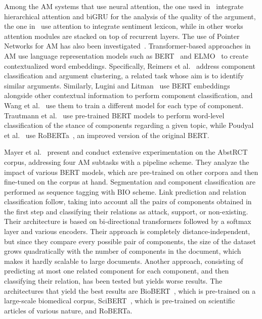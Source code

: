 \documentclass[journal]{IEEEtran}
\begin{document}
Among the AM systems that use neural attention, the one used in~\cite{DBLP:journals/jbd/SuhartonoGWDFA20} integrate hierarchical attention and biGRU for the analysis of the quality of the argument, the one in~\cite{lin-etal-2019-lexicon} use attention to integrate sentiment lexicon, while in other works~\cite{D18-1402,Spliethver2019IsIW,D16-1129} attention modules are stacked on top of recurrent layers. The use of Pointer Networks for AM has also been investigated~\cite{potash2017here}.
Transformer-based approaches in AM use language representation models such as BERT~\cite{DBLP:conf/naacl/DevlinCLT19} and ELMO~\cite{peters-etal-2018-deep} to create contextualized word embeddings.
Specifically, Reimers et al.~\cite{reimers-etal-2019-classification} address component classification and argument clustering, a related task whose aim is to identify similar arguments.
Similarly, Lugini and Litman~\cite{lugini2020} use BERT embeddings alongside other contextual information to perform component classification, and Wang et al.~\cite{wang-etal-2020-argumentation} use them to train a different model for each type of component.
Trautmann et al.~\cite{aurc8} use pre-trained BERT models to perform word-level classification of the stance of components regarding a given topic, while Poudyal et al.~\cite{poudyal-etal-2020-echr} use RoBERTa~\cite{roberta}, an improved version of the original BERT.

Mayer et al.~\cite{DBLP:conf/ecai/0002CV20} present and conduct extensive experimentation on the AbstRCT corpus, addressing four AM subtasks with a pipeline scheme. They analyze the impact of various BERT models, which are pre-trained on other corpora and then fine-tuned on the corpus at hand.
Segmentation and component classification are performed as sequence tagging with BIO scheme. Link prediction and relation classification follow, taking into account all the pairs of components obtained in the first step and classifying their relations as attack, support, or non-existing. Their architecture is based on bi-directional transformers followed by a softmax layer and various encoders. Their approach is completely distance-independent, but since they compare every possible pair of components, the size of the dataset grows quadratically with the number of components in the document, which makes it hardly scalable to large documents. Another approach, consisting of predicting at most one related component for each component, and then classifying their relation, has been tested but yields worse results.
The architectures that yield the best results are BioBERT~\cite{biobert}, which is pre-trained on a large-scale biomedical corpus, SciBERT~\cite{scibert}, which is pre-trained on scientific articles of various nature, and RoBERTa.
 
\end{document}
